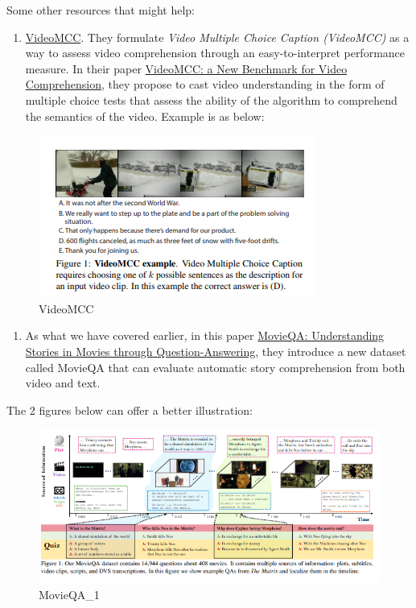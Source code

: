 \documentclass{acm_proc_article-sp}
\providecommand{\tightlist}{%
  \setlength{\itemsep}{0pt}\setlength{\parskip}{0pt}}
\begin{document}
Some other resources that might help:

\begin{enumerate}
\def\labelenumi{\arabic{enumi}.}
\setcounter{enumi}{2}
\tightlist
\item
  \href{http://videomcc.org/}{VideoMCC}. They formulate \emph{Video
  Multiple Choice Caption (VideoMCC)} as a way to assess video
  comprehension through an easy-to-interpret performance measure. In
  their paper \href{https://arxiv.org/pdf/1606.07373.pdf}{VideoMCC: a
  New Benchmark for Video Comprehension}, they propose to cast video
  understanding in the form of multiple choice tests that assess the
  ability of the algorithm to comprehend the semantics of the video.
  Example is as below:
\end{enumerate}

\begin{figure}
\centering
\includegraphics{img/mcc.png}
\caption{VideoMCC}
\end{figure}

\begin{enumerate}
\def\labelenumi{\arabic{enumi}.}
\setcounter{enumi}{3}
\tightlist
\item
  As what we have covered earlier, in this paper
  \href{https://arxiv.org/pdf/1512.02902.pdf}{MovieQA: Understanding
  Stories in Movies through Question-Answering}, they introduce a new
  dataset called MovieQA that can evaluate automatic story comprehension
  from both video and text.
\end{enumerate}

The 2 figures below can offer a better illustration:

\begin{figure}
\centering
\includegraphics{img/movieqa1.png}
\caption{MovieQA\_1}
\end{figure}
\end{document}
